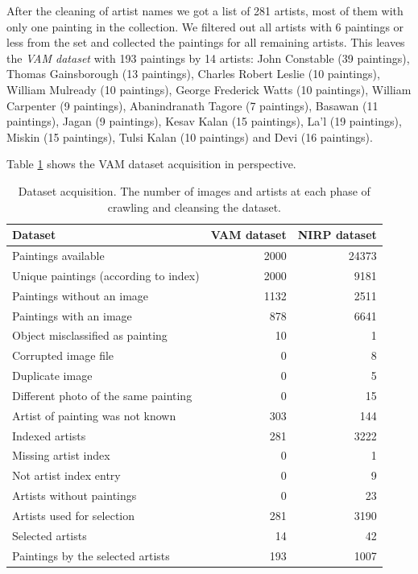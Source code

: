 \documentclass[11pt,a4paper,draft]{report}
\begin{document}
\begin{multicols}{2}
After the cleaning of artist names we got a list of 281 artists, most of them
with only one painting in the collection.  We filtered out all artists with 6
paintings or less from the set and collected the paintings for all remaining
artists.  This leaves the \emph{VAM dataset} with 193 paintings by 14 artists:
John Constable (39 paintings), Thomas Gainsborough (13 paintings), Charles
Robert Leslie (10 paintings), William Mulready (10 paintings), George Frederick
Watts (10 paintings), William Carpenter (9 paintings), Abanindranath Tagore (7
paintings), Basawan (11 paintings), Jagan (9 paintings), Kesav Kalan (15
paintings), La'l (19 paintings), Miskin (15 paintings), Tulsi Kalan (10
paintings) and Devi (16 paintings).

Table \ref{tab:crawl} shows the VAM dataset acquisition in perspective.

\begin{table}[ptb]
\centering
{}
\begin{tabular}{|l|rr|}
\toprule
Dataset & VAM dataset & NIRP dataset \\
\midrule
Paintings available                   & 2000 & 24373 \\
Unique paintings (according to index) & 2000 &  9181 \\
Paintings without an image            & 1132 &  2511 \\
Paintings with an image               &  878 &  6641 \\
Object misclassified as painting      &   10 &     1 \\
Corrupted image file                  &    0 &     8 \\
Duplicate image                       &    0 &     5 \\
Different photo of the same painting  &    0 &    15 \\
Artist of painting was not known      &  303 &   144 \\
\midrule
Indexed artists                       &  281 &  3222 \\
Missing artist index                  &    0 &     1 \\
Not artist index entry                &    0 &     9 \\
Artists without paintings             &    0 &    23 \\
Artists used for selection            &  281 &  3190 \\
Selected artists                      &   14 &    42 \\
\midrule
Paintings by the selected artists     &  193 &  1007 \\
\bottomrule
\end{tabular}
\caption[Dataset acquisition]{Dataset acquisition.  The number of images and
artists at each phase of crawling and cleansing the dataset.}
\label{tab:crawl}
\end{table}


\end{multicols}
\end{document}
